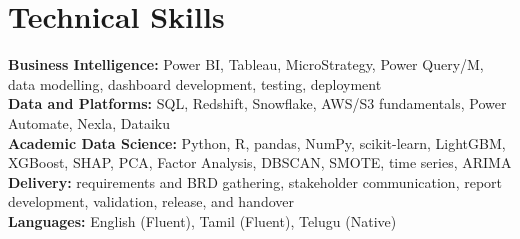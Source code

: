 \documentclass[a4paper,10pt]{article}
\begin{document}
\section{Technical Skills}
\textbf{Business Intelligence:} Power BI, Tableau, MicroStrategy, Power Query/M, data modelling, dashboard development, testing, deployment\\[2pt]
\textbf{Data and Platforms:} SQL, Redshift, Snowflake, AWS/S3 fundamentals, Power Automate, Nexla, Dataiku\\[2pt]
\textbf{Academic Data Science:} Python, R, pandas, NumPy, scikit-learn, LightGBM, XGBoost, SHAP, PCA, Factor Analysis, DBSCAN, SMOTE, time series, ARIMA\\[2pt]
\textbf{Delivery:} requirements and BRD gathering, stakeholder communication, report development, validation, release, and handover\\[2pt]
\textbf{Languages:} English (Fluent), Tamil (Fluent), Telugu (Native)
\end{document}
